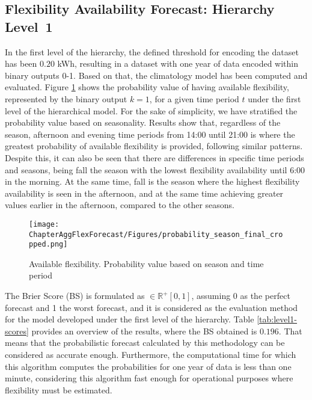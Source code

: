 \subsection{Flexibility Availability Forecast: Hierarchy Level~1} \label{Sect:ResultsLevel1}
In the first level of the hierarchy, the defined threshold for encoding the dataset has been $0.20$ kWh, resulting in a dataset with one year of data encoded within binary outputs 0-1. Based on that, the climatology model has been computed and evaluated. 
Figure \ref{fig:LEVEL1-P_YEAR} shows the probability value of having available flexibility, represented by the binary output $k=1$, for a given time period $t$ under the first level of the hierarchical model. For the sake of simplicity, we have stratified the probability value based on seasonality. Results show that, regardless of the season, afternoon and evening time periods from 14:00 until 21:00 is where the greatest probability of available flexibility is provided, following similar patterns. Despite this, it can also be seen that there are differences in specific time periods and seasons, being fall the season with the lowest flexibility availability until 6:00 in the morning. At the same time, fall is the season where the highest flexibility availability is seen in the afternoon, and at the same time achieving greater values earlier in the afternoon, compared to the other seasons.   

\begin{figure}[]
\centerline{\texttt{[image: ChapterAggFlexForecast/Figures/probability\_season\_final\_cropped.png]}}
\caption{Available flexibility. Probability value based on season and time period}
\label{fig:LEVEL1-P_YEAR}
\end{figure}

The Brier Score (BS) is formulated as $\in \mathbb{R}^+ [0,1]$, assuming 0 as the perfect forecast and 1 the worst forecast, and it is considered as the evaluation method for the model developed under the first level of the hierarchy. Table \ref{tab:level1-scores} provides an overview of the results, where the BS obtained is $0.196$. That means that the probabilistic forecast calculated by this methodology can be considered as accurate enough. Furthermore, the computational time for which this algorithm computes the probabilities for one year of data is less than one minute, considering this algorithm fast enough for operational purposes where flexibility must be estimated. 

